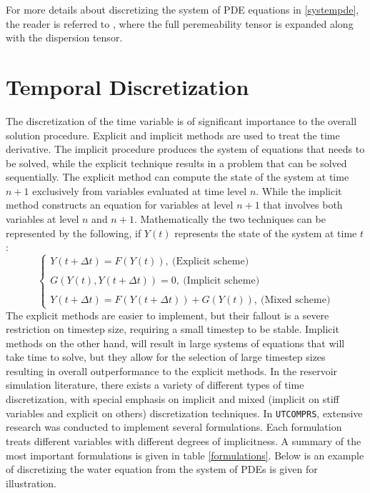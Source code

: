 For more details about discretizing the system of PDE equations in \ref{systempde}, the reader is referred to \cite{phdfernandes}, where the full
peremeability tensor is expanded along with the dispersion tensor.

\section{Temporal Discretization}
The discretization of the time variable is of significant importance to the overall solution procedure.
Explicit and implicit methods are used to treat the time derivative. The implicit procedure produces the 
system of equations that needs to be solved, while the explicit technique results in a problem that can be
solved sequentially. The explicit method can compute the state of the system at time $n+1$ exclusively from 
variables evaluated at time level $n$. While the implicit method constructs an equation for variables at level
$n+1$ that involves both variables at level $n$ and $n+1$. Mathematically the two techniques can be represented by 
the following, if $Y(t)$ represents the state of the system at time $t$:
\begingroup\makeatletter\def\f@size{12}\check@mathfonts
\begin{equation}
	\begin{cases}
		Y(t+\Delta t) = F(Y(t)), \ \text{(Explicit scheme)}\\\\
		G(Y(t), Y(t+\Delta t)) = 0, \ \text{(Implicit scheme)}\\\\
		Y(t+\Delta t) = F(Y(t+\Delta t)) + G(Y(t)), \ \text{(Mixed scheme)}
	\end{cases}
\end{equation}\endgroup
The explicit methods are easier to implement, but their fallout is a severe restriction on timestep size, 
requiring a small timestep to be stable. Implicit methods on the other hand, will result in large systems of 
equations that will take time to solve, but they allow for the selection of large timestep sizes resulting in 
overall outperformance to the explicit methods. In the reservoir simulation literature, there exists a variety of
different types of time discretization, with special emphasis on implicit and mixed (implicit on stiff variables and explicit on others) 
discretization techniques. In \texttt{UTCOMPRS}, extensive research was conducted to implement several formulations. Each formulation treats
different variables with different degrees of implicitness. A summary of the most important formulations is given in table \ref{formulations}.
Below is an example of discretizing the water equation from the system of PDEs is given for illustration.

